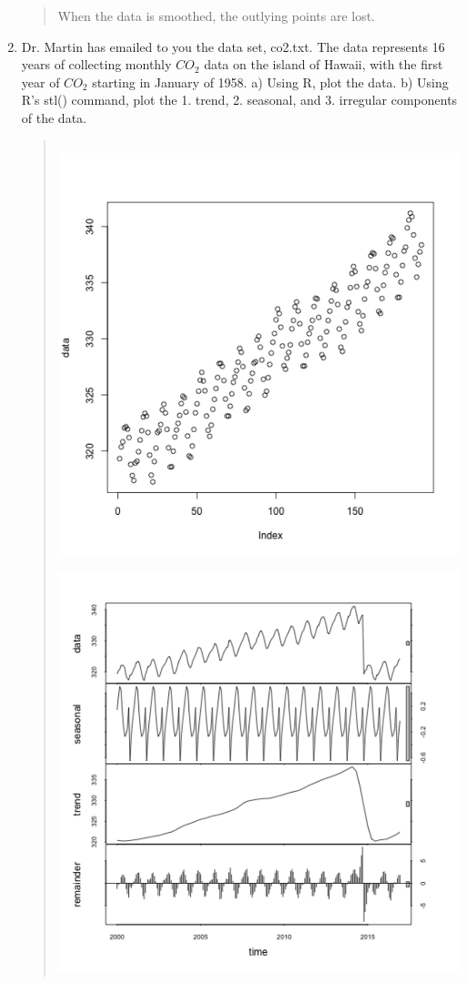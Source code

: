 \documentclass{hw}
\begin{document}
\begin{enumerate}
\begin{quote}
\begin{minipage}{0.5\textwidth}
\end{minipage}
When the data is smoothed, the outlying points are lost.
\end{quote}

\newpage
\item Dr. Martin has emailed to you the data set, co2.txt. The data represents 16 years of
collecting monthly $CO_{2}$ data on the island of Hawaii, with the first year of $CO_{2}$ starting
in January of 1958. a) Using R, plot the data. b) Using R’s stl() command, plot the 1. trend, 2.
seasonal, and 3. irregular components of the data.
\begin{quote}
\inputminted{r}{num_two.R}
\begin{minipage}{0.5\textwidth}
\includegraphics[scale=0.4]{02data_plot}
\end{minipage}
\begin{minipage}{0.5\textwidth}
\includegraphics[scale=0.4]{02seasonal}

\end{minipage}
\end{quote}
\end{enumerate}
\end{document}
